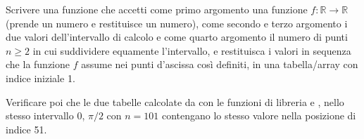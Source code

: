 \begin{Exercise}[label=fn-05]
Scrivere una funzione  che accetti come primo argomento una
funzione \( f: ℝ \to ℝ \) (prende un numero e restituisce un numero), come
secondo e terzo argomento i due valori dell'intervallo di calcolo e come quarto
argomento il numero di punti \( n \geq 2 \) in cui suddividere equamente
l'intervallo, e restituisca i valori in sequenza che la funzione \( f \) assume
nei punti d'ascissa così definiti, in una tabella/array con indice iniziale 1.

Verificare poi che le due tabelle calcolate da  con le funzioni di
libreria  e , nello stesso intervallo \( 0 \), \(
\pi/2 \) con \( n = 101 \) contengano lo stesso valore nella posizione di indice
51.
\end{Exercise}


